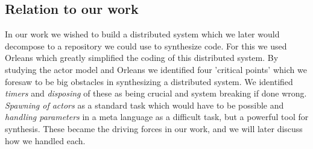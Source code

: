 \subsection{Relation to our work}
In our work we wished to build a distributed system which we later would decompose to a repository we could use to synthesize code. For this we used Orleans which greatly simplified the coding of this distributed system. By studying the actor model and Orleans we identified four 'critical points' which we foresaw to be big obstacles in synthesizing a distributed system. We identified \textit{timers} and \textit{disposing} of these as being crucial and system breaking if done wrong. \textit{Spawning of actors} as a standard task which would have to be possible and \textit{handling parameters} in a meta language as a difficult task, but a powerful tool for synthesis. These became the driving forces in our work, and we will later discuss how we handled each. 